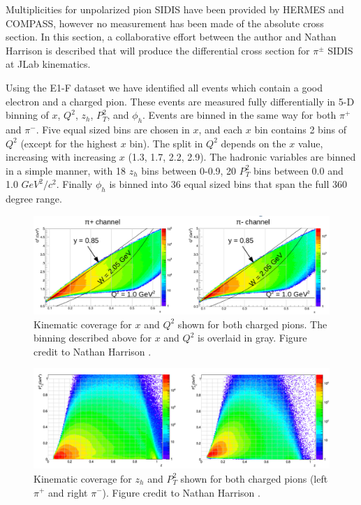 Multiplicities for unpolarized pion SIDIS have been provided by HERMES and COMPASS, however no measurement has been made of the absolute cross section.  In this section, a collaborative effort between the author and Nathan Harrison is described that will produce the differential cross section for $\pi^{\pm}$ SIDIS at JLab kinematics.  

Using the E1-F dataset we have identified all events which contain a good electron and a charged pion.  These events are measured fully differentially in 5-D binning of $x$, $Q^2$, $z_h$, $P_{T}^{2}$, and $\phi_h$.  Events are binned in the same way for both $\pi^+$ and $\pi^-$.  Five equal sized bins are chosen in $x$, and each $x$ bin contains 2 bins of $Q^2$ (except for the highest $x$ bin).  The split in $Q^2$ depends on the $x$ value, increasing with increasing $x$ (1.3, 1.7, 2.2, 2.9).  The hadronic variables are binned in a simple manner, with 18 $z_h$ bins between 0-0.9, 20 $P_{T}^{2}$ bins between 0.0 and 1.0 $GeV^2/c^2$.  Finally $\phi_h$ is binned into 36 equal sized bins that span the full 360 degree range. \\

\begin{figure}
  \centering 

  \includegraphics[width=14cm]{image/nathan-xq2.png}
  \caption{Kinematic coverage for $x$ and $Q^2$ shown for both charged pions.  The binning described above for $x$ and $Q^2$ is overlaid in gray.  Figure credit to Nathan Harrison \cite{theses-harrison:2015}.}

\end{figure}

\begin{figure}
  \centering 

  \includegraphics[width=14cm]{image/nathan-zpt.png}
  \caption{Kinematic coverage for $z_h$ and $P_{T}^{2}$ shown for both charged pions (left $\pi^+$ and right $\pi^-$).  Figure credit to Nathan Harrison \cite{theses-harrison:2015}.}

\end{figure}

